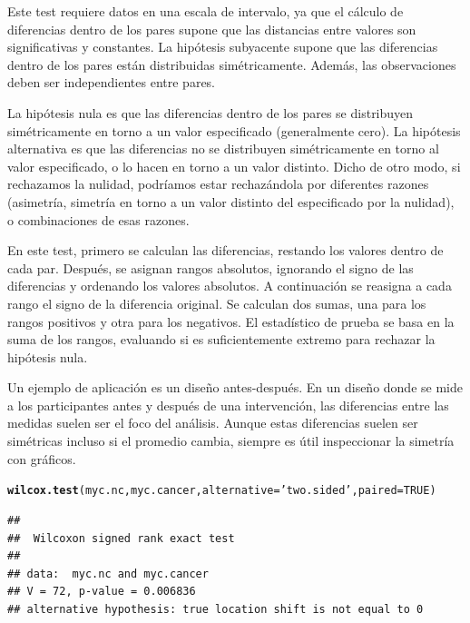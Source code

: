 \documentclass{config/apuntes}\usepackage[]{graphicx}\usepackage[]{xcolor}
\makeatletter
\newcommand{\hlnum}[1]{\textcolor[rgb]{0.686,0.059,0.569}{#1}}%
\newcommand{\hlsng}[1]{\textcolor[rgb]{0.192,0.494,0.8}{#1}}%
\newcommand{\hldef}[1]{\textcolor[rgb]{0.345,0.345,0.345}{#1}}%
\newcommand{\hlkwc}[1]{\textcolor[rgb]{0.333,0.667,0.333}{#1}}%
\newcommand{\hlkwd}[1]{\textcolor[rgb]{0.737,0.353,0.396}{\textbf{#1}}}%
\newenvironment{kframe}{%
 \def\at@end@of@kframe{}%
 \ifinner\ifhmode%
  \def\at@end@of@kframe{\end{minipage}}%
  \begin{minipage}{\columnwidth}%
 \fi\fi%
 \def\FrameCommand##1{\hskip\@totalleftmargin \hskip-\fboxsep
 \colorbox{shadecolor}{##1}\hskip-\fboxsep
     \hskip-\linewidth \hskip-\@totalleftmargin \hskip\columnwidth}%
 \MakeFramed {\advance\hsize-\width
   \@totalleftmargin\z@ \linewidth\hsize
   \@setminipage}}%
 {\par\unskip\endMakeFramed%
 \at@end@of@kframe}
\newenvironment{knitrout}{}{} %
\makeatother
\begin{document}
Este test requiere datos en una escala de intervalo, ya que el cálculo de diferencias dentro de los pares supone que las distancias entre valores son significativas y constantes.  La hipótesis subyacente supone que las diferencias dentro de los pares están distribuidas simétricamente. Además, las observaciones deben ser independientes entre pares.

La hipótesis nula es que las diferencias dentro de los pares se distribuyen simétricamente en torno a un valor especificado (generalmente cero). La hipótesis alternativa es que las diferencias no se distribuyen simétricamente en torno al valor especificado, o lo hacen en torno a un valor distinto. Dicho de otro modo, si rechazamos la nulidad, podríamos estar rechazándola por diferentes razones (asimetría, simetría en torno a un valor distinto del especificado por la nulidad), o combinaciones de esas razones. 

En este test, primero se calculan las diferencias, restando los valores dentro de cada par. Después, se asignan rangos absolutos, ignorando el signo de las diferencias y ordenando los valores absolutos. A continuación se reasigna a cada rango el signo de la diferencia original. Se calculan dos sumas, una para los rangos positivos y otra para los negativos. El estadístico de prueba se basa en la suma de los rangos, evaluando si es suficientemente extremo para rechazar la hipótesis nula.

Un ejemplo de aplicación es un diseño antes-después. En un diseño donde se mide a los participantes antes y después de una intervención, las diferencias entre las medidas suelen ser el foco del análisis. Aunque estas diferencias suelen ser simétricas incluso si el promedio cambia, siempre es útil inspeccionar la simetría con gráficos.

\begin{knitrout}
\color{fgcolor}\begin{kframe}
\begin{alltt}
\hlkwd{wilcox.test}\hldef{(myc.nc, myc.cancer,} \hlkwc{alternative} \hldef{=} \hlsng{'two.sided'}\hldef{,} \hlkwc{paired} \hldef{=} \hlnum{TRUE}\hldef{)}
\end{alltt}
\begin{verbatim}
## 
## 	Wilcoxon signed rank exact test
## 
## data:  myc.nc and myc.cancer
## V = 72, p-value = 0.006836
## alternative hypothesis: true location shift is not equal to 0
\end{verbatim}
\end{kframe}
\end{knitrout}
\end{document}

